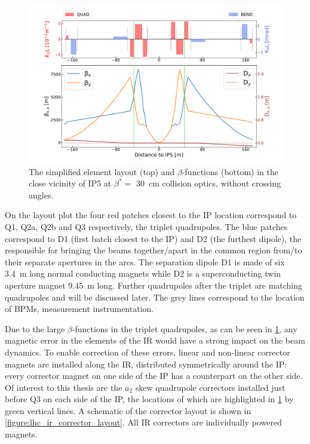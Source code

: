 \begin{figure}[!hbt]
  \centering
  \includegraphics*[width=\linewidth]{Figures/Optics_Measurements_Corrections_at_LHC/lhc_ir5_zoomed.pdf}
  \caption{The simplified element layout (top) and \(\beta\)-functions (bottom) in the close vicinity of IP\num{5} at \(\beta^{\ast} =\) \qty{30}{\centi\metre} collision optics, without crossing angles.}
  \label{figure:lhc_ir5_zoomed}
\end{figure}

On the layout plot the four \textcolor{latwiss_red}{red patches} closest to the \gls{IP} location correspond to Q\num{1}, Q\num{2}a, Q\num{2}b and Q\num{3} respectively, the triplet quadrupoles.
The \textcolor{latwiss_blue}{blue patches} correspond to D\num{1} (first batch closest to the IP) and D\num{2} (the furthest dipole), the  responsible for bringing the beams together/apart in the common region from/to their separate apertures in the arcs.
The separation dipole D\num{1} is made of six \qty{3.4}{\meter} long normal conducting magnets while D\num{2} is a superconducting twin aperture magnet \qty{9.45}{\meter} long.
Further quadrupoles after the triplet are matching quadrupoles and will be discussed later.
The grey lines correspond to the location of \glspl{BPM}, measurement instrumentation.
\break

Due to the large \(\beta\)-functions in the triplet quadrupoles, as can be seen in \cref{figure:lhc_ir5_zoomed}, any magnetic error in the elements of the IR would have a strong impact on the beam dynamics.
To enable correction of these errors, linear and non-linear corrector magnets are installed along the IR, distributed symmetrically around the IP: every corrector magnet on one side of the IP has a counterpart on the other side.
Of interest to this thesis are the \(a_2\) \gls{skew} quadrupole correctors installed just before Q\num{3} on each side of the \gls{IP}, the locations of which are highlighted in \cref{figure:lhc_ir5_zoomed} by \textcolor{mqsx_green}{green vertical lines}.
A schematic of the corrector layout is shown in \cref{figure:lhc_ir_corrector_layout}.
All IR correctors are individually powered magnets.

